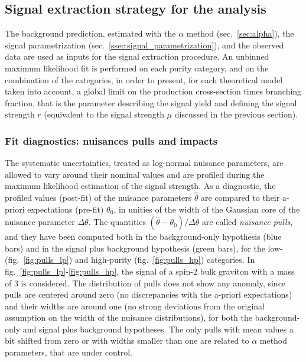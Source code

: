 
\subsection{Signal extraction strategy for the analysis}

The background prediction, estimated with the $\alpha$ method (sec.~\ref{sec:alpha}), the signal parametrization (sec.~\ref{ssec:signal_parametrization}), and the observed data are used as inputs for the signal extraction procedure. An unbinned maximum likelihood fit is performed on each purity category, and on the combination of the categories, in order to present, for each theoretical model taken into account, a global limit on the production cross-section times branching fraction, that is the parameter describing the signal yield and defining the signal strength $r$ (equivalent to the signal strength $\mu$ discussed in the previous section).

\subsubsection{Fit diagnostics: nuisances pulls and impacts}

The systematic uncertainties, treated as log-normal nuisance parameters, are allowed to vary around their nominal values and are profiled during the maximum likelihood estimation of the signal strength. As a diagnostic, the profiled values (post-fit) of the nuisance parameters $\hat{\theta}$ are compared to their a-priori expectations (pre-fit) $\theta_0$, in unities of the width of the Gaussian core of the nuisance parameter $\Delta \theta$. The quantities $(\hat{\theta} - \theta_0) / \Delta \theta$ are called \emph{nuisance pulls}, and they have been computed both in the background-only hypothesis (blue bars) and in the signal plus background hypothesis (green bars), for the low- (fig.~\ref{fig:pulls_lp}) and high-purity (fig.~\ref{fig:pulls_hp}) categories. In fig.~\ref{fig:pulls_lp}-\ref{fig:pulls_hp}, the signal of a spin-2 bulk graviton with a mass of 3 \TeV is considered. The distribution of pulls does not show any anomaly, since pulls are centered around zero (no discrepancies with the a-priori expectations) and their widths are around one (no strong deviations from the original assumption on the width of the nuisance distributions), for both the background-only and signal plus background hypotheses. The only pulls with mean values a bit shifted from zero or with widths smaller than one are related to $\alpha$ method parameters, that are under control.

